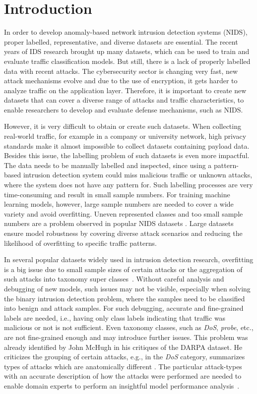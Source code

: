 \section{Introduction}
In order to develop anomaly-based network intrusion detection systems (NIDS), proper labelled, representative, and diverse datasets are essential. The recent years of IDS research brought up many datasets, which can be used to train and evaluate traffic classification models. But still, there is a lack of properly labelled data with recent attacks. The cybersecurity sector is changing very fast, new attack mechanisms evolve and due to the use of encryption, it gets harder to analyze traffic on the application layer. Therefore, it is important to create new datasets that can cover a diverse range of attacks and traffic characteristics, to enable researchers to develop and evaluate defense mechanisms, such as NIDS.

However, it is very difficult to obtain or create such datasets. When collecting real-world traffic, for example in a company or university network, high privacy standards make it almost impossible to collect datasets containing payload data. Besides this issue, the labelling problem of such datasets is even more impactful. The data needs to be manually labelled and inspected, since using a pattern-based intrusion detection system could miss malicious traffic or unknown attacks, where the system does not have any pattern for. Such labelling processes are very time-consuming and result in small sample numbers. For training machine learning models, however, large sample numbers are needed to cover a wide variety and avoid overfitting. Uneven represented classes and too small sample numbers are a problem observed in popular NIDS datasets \cite{Leung_Leckie,Portnoy01intrusiondetection}. Large datasets ensure model robustness by covering diverse attack scenarios and reducing the likelihood of overfitting to specific traffic patterns.

In several popular datasets widely used in intrusion detection research, overfitting is a big issue due to small sample sizes of certain attacks or the aggregation of such attacks into taxonomy super classes~\cite{zoghi2024unsw}. Without careful analysis and debugging of new models, such issues may not be visible, especially when solving the binary intrusion detection problem, where the samples need to be classified into benign and attack samples. For such debugging, accurate and fine-grained labels are needed, i.e., having only class labels indicating that traffic was malicious or not is not sufficient. Even taxonomy classes, such as \emph{DoS}, \emph{probe}, etc., are not fine-grained enough and may introduce further issues. This problem was already identified by John McHugh in his critiques of the DARPA dataset. He criticizes the grouping of certain attacks, e.g., in the \emph{DoS} category, summarizes types of attacks which are anatomically different \cite{mchugh2000testing}. The particular attack-types with an accurate description of how the attacks were performed are needed to enable domain experts to perform an insightful model performance analysis~\cite{10223401}.

